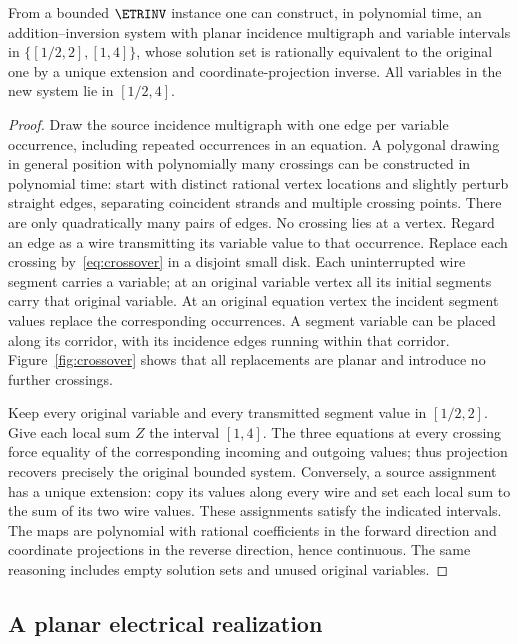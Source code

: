 \begin{lemma}
\label{lem:bounded-planarization}
From a bounded $\ETRINV$ instance one can construct, in polynomial time,
an addition--inversion system with planar incidence multigraph and variable
intervals in $\{[1/2,2],[1,4]\}$, whose solution set is rationally equivalent
to the original one by a unique extension and coordinate-projection inverse.
All variables in the new system lie in $[1/2,4]$.
\end{lemma}
\begin{proof}
Draw the source incidence multigraph with one edge per variable occurrence,
including repeated occurrences in an equation. A polygonal drawing in general
position with polynomially many crossings can be constructed in polynomial
time: start with distinct rational vertex locations and slightly perturb
straight edges, separating coincident strands and multiple crossing points.
There are only quadratically many pairs of edges. No crossing lies at a vertex.
Regard an edge as a wire transmitting its variable value to that occurrence.
Replace each crossing by~\eqref{eq:crossover} in a disjoint small disk.
Each uninterrupted wire segment carries a variable; at an original variable
vertex all its initial segments carry that original variable. At an original
equation vertex the incident segment values replace the corresponding
occurrences. A segment variable can be placed along its corridor, with its
incidence edges running within that corridor. Figure~\ref{fig:crossover}
shows that all replacements are planar and introduce no further crossings.

Keep every original variable and every transmitted segment value in
$[1/2,2]$. Give each local sum $Z$ the interval $[1,4]$.
The three equations at every crossing force equality of the corresponding
incoming and outgoing values; thus projection recovers precisely the original
bounded system. Conversely, a source assignment has a unique extension:
copy its values along every wire and set each local sum to the sum of its two
wire values. These assignments satisfy the indicated intervals. The maps are
polynomial with rational coefficients in the forward direction and coordinate
projections in the reverse direction, hence continuous. The same reasoning
includes empty solution sets and unused original variables.
\end{proof}

\subsection{A planar electrical realization}

